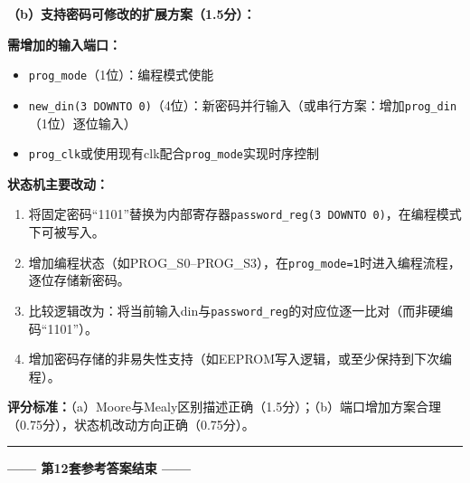 \textbf{（b）支持密码可修改的扩展方案（1.5分）：}

\textbf{需增加的输入端口：}
\begin{itemize}
  \item \texttt{prog\_mode}（1位）：编程模式使能
  \item \texttt{new\_din(3 DOWNTO 0)}（4位）：新密码并行输入（或串行方案：增加\texttt{prog\_din}（1位）逐位输入）
  \item \texttt{prog\_clk}或使用现有clk配合\texttt{prog\_mode}实现时序控制
\end{itemize}

\textbf{状态机主要改动：}
\begin{enumerate}
  \item 将固定密码``1101''替换为内部寄存器\texttt{password\_reg(3 DOWNTO 0)}，在编程模式下可被写入。
  \item 增加编程状态（如PROG\_S0--PROG\_S3），在\texttt{prog\_mode=1}时进入编程流程，逐位存储新密码。
  \item 比较逻辑改为：将当前输入din与\texttt{password\_reg}的对应位逐一比对（而非硬编码``1101''）。
  \item 增加密码存储的非易失性支持（如EEPROM写入逻辑，或至少保持到下次编程）。
\end{enumerate}

\textbf{评分标准：}（a）Moore与Mealy区别描述正确（1.5分）；（b）端口增加方案合理（0.75分），状态机改动方向正确（0.75分）。

\vspace{0.5cm}
{\centering
\rule{0.8\textwidth}{0.5pt}
\vspace{0.3cm}

\textbf{—— 第12套参考答案结束 ——}

\vspace{0.5cm}}

\endinput
